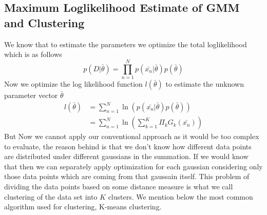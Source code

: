 \documentclass[a4paper]{article}
\begin{document}
\subsection{Maximum Loglikelihood Estimate of GMM and Clustering}
We know that to estimate the parameters we optimize the total loglikelihood which is as follows
\begin{equation}
p(D|\bar{\theta})=\prod_{n=1}^{N}p(\bar{x_{n}}|\bar{\theta})p(\bar{\theta})
\end{equation}Now we optimize the log likelihood function $l(\bar{\theta})$ to estimate the unknown parameter vector $\bar{\theta}$
\[
\begin{split}
l(\bar{\theta})&=\sum_{n=1}^{N}\ln(p(\bar{x_{n}}|\bar{\theta})p(\bar{\theta})) \\
               &=\sum_{n=1}^{N}\ln(\sum_{k=1}^{K}\Pi_{k}G_{k}(\bar{x_{n}}))
\end{split}
\]But Now we cannot apply our conventional approach as it would be too complex to evaluate, the reason behind is that we don't know how different data points are distributed under different gaussians in the summation. If we would know that then we can separately apply optimization for each gaussian considering only those data points which are coming from that gaussain itself. This problem of dividing the data points based on some distance measure is what we call clustering of the data set into $K$ clusters. We mention below the most common algorithm used for clustering, K-means clustering.
\end{document}
